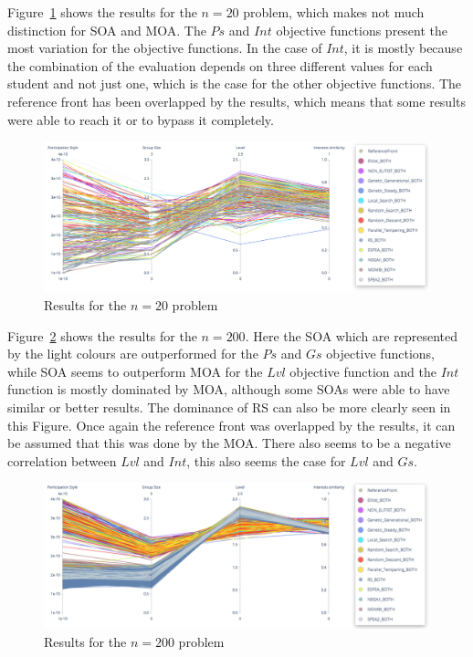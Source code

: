 Figure~\ref{fig:parallel_20} shows the results for the $n=20$ problem, which makes not much distinction for SOA and MOA. The $Ps$ and $Int$ objective functions present the most variation for the objective functions. In the case of $Int$, it is mostly because the combination of the evaluation depends on three different values for each student and not just one, which is the case for the other objective functions. The reference front has been overlapped by the results, which means that some results were able to reach it or to bypass it completely.\\

\begin{figure}[H]
    \centering
    \includegraphics[width=\textwidth]{images/parallel_20.png}
    \caption{Results for the $n=20$ problem}
    \label{fig:parallel_20}
\end{figure}

Figure~\ref{fig:parallel_200} shows the results for the $n=200$. Here the SOA which are represented by the light colours are outperformed for the $Ps$ and $Gs$ objective functions, while SOA seems to outperform MOA for the $Lvl$ objective function and the $Int$ function is mostly dominated by MOA, although some SOAs were able to have similar or better results. The dominance of RS can also be more clearly seen in this Figure. Once again the reference front was overlapped by the results, it can be assumed that this was done by the MOA. There also seems to be a negative correlation between $Lvl$ and $Int$, this also seems the case for $Lvl$ and $Gs$.

\begin{figure}[H]
    \centering
    \includegraphics[width=\textwidth]{images/parallel_200.png}
    \caption{Results for the $n=200$ problem}
    \label{fig:parallel_200}
\end{figure}

